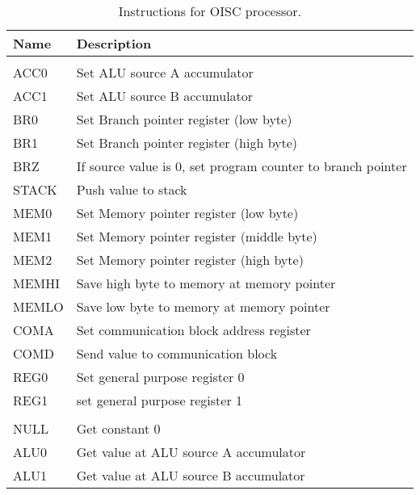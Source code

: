 \begin{longtable}[h!]{| l | p{} |}
	\caption{Instructions for OISC processor.}
	\label{table:oisc_instructions}\\
	
	\hline 
	\rowcolor[rgb]{0.82,0.82,0.82}
	Name & Description \\\hline
	\endhead		
	
	\arrayrulecolor{black}\hline
	\endfoot
	
	\multicolumn{2}{|c|}{
		\cellcolor[rgb]{0.7,0.7,1}\textit{Destination Addresses}} \\\hline
	\arrayrulecolor[rgb]{0.82,0.82,0.82}
	
	ACC0 & Set ALU source A accumulator \\
	ACC1 & Set ALU source B accumulator \\\hline
	BR0  & Set Branch pointer register (low byte) \\
	BR1  & Set Branch pointer register (high byte) \\
	BRZ  & If source value is 0, set program counter to branch pointer \\\hline
	STACK& Push value to stack \\
	MEM0 & Set Memory pointer register (low byte) \\
	MEM1 & Set Memory pointer register (middle byte) \\
	MEM2 & Set Memory pointer register (high byte) \\
	MEMHI& Save high byte to memory at memory pointer \\
	MEMLO& Save low byte to memory at memory pointer \\\hline
	COMA & Set communication block address register \\
	COMD & Send value to communication block \\\hline
	REG0 & Set general purpose register 0 \\
	REG1 & set general purpose register 1 \\
	
	\arrayrulecolor{black}\hline
	\multicolumn{2}{|c|}{
		\cellcolor[rgb]{0.7,0.7,1}\textit{Source Addresses}} \\
	\hline\arrayrulecolor[rgb]{0.82,0.82,0.82}
	
	NULL & Get constant 0 \\
	ALU0 & Get value at ALU source A accumulator \\
	ALU1 & Get value at ALU source B accumulator \\\hline
	

\end{longtable}
